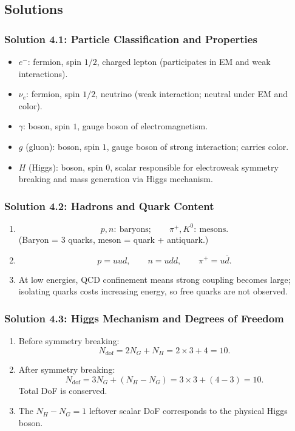 \subsection{Solutions}

\subsubsection*{Solution 4.1: Particle Classification and Properties}

\begin{itemize}
  \item $e^-$: fermion, spin $1/2$, charged lepton (participates in EM and weak interactions).
  \item $\nu_e$: fermion, spin $1/2$, neutrino (weak interaction; neutral under EM and color).
  \item $\gamma$: boson, spin $1$, gauge boson of electromagnetism.
  \item $g$ (gluon): boson, spin $1$, gauge boson of strong interaction; carries color.
  \item $H$ (Higgs): boson, spin $0$, scalar responsible for electroweak symmetry breaking and mass generation via Higgs mechanism.
\end{itemize}

\subsubsection*{Solution 4.2: Hadrons and Quark Content}

\begin{enumerate}[label=(\alph*)]
  \item
  \[
    p, n:\ \text{baryons};\qquad \pi^+, K^0:\ \text{mesons}.
  \]
  (Baryon = 3 quarks, meson = quark + antiquark.)

  \item
  \[
    p = uud,\qquad n = udd,\qquad \pi^+ = u\bar d.
  \]

  \item At low energies, QCD confinement means strong coupling becomes large; isolating quarks costs increasing energy, so free quarks are not observed.
\end{enumerate}

\subsubsection*{Solution 4.3: Higgs Mechanism and Degrees of Freedom}

\begin{enumerate}[label=(\alph*)]
  \item Before symmetry breaking:
  \[
    N_{\mathrm{dof}} = 2N_G + N_H = 2\times 3 + 4 = 10.
  \]

  \item After symmetry breaking:
  \[
    N_{\mathrm{dof}} = 3N_G + (N_H-N_G)=3\times3 + (4-3)=10.
  \]
  Total DoF is conserved.

  \item The $N_H-N_G = 1$ leftover scalar DoF corresponds to the physical Higgs boson.
\end{enumerate}


